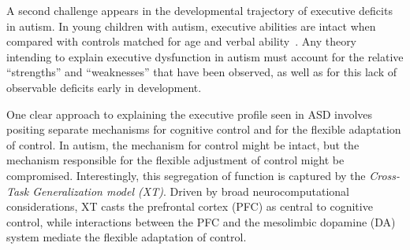 A second challenge appears in the developmental trajectory of
executive deficits in autism.  In young children with autism,
executive abilities are intact when compared with controls matched for
age and verbal ability~\cite{GriffithEM:1999:AutismYoungED}.
Any theory intending to explain executive dysfunction in autism must account for
the relative ``strengths'' and ``weaknesses'' that have been observed,
as well as for this lack of observable deficits early in development.

One clear approach to explaining the executive profile seen in ASD
involves positing separate mechanisms for cognitive control and for
the flexible adaptation of control.  In autism, the mechanism for
control might be intact, but the mechanism responsible for the flexible
adjustment of control might be compromised.  Interestingly, this
segregation of function is captured by the 
\emph{Cross-Task Generalization model (XT)}.  Driven by broad
neurocomputational considerations, XT casts the prefrontal cortex
(PFC) as central to cognitive control, while interactions between the
PFC and the mesolimbic dopamine (DA) system mediate the flexible
adaptation of control.  


 
